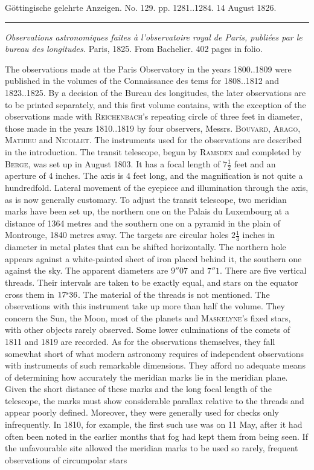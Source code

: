 \clearpage
{}
\hypertarget{native-646-lower}{}
\begin{center}\small Göttingische gelehrte Anzeigen. No. 129. pp. 1281..1284. 14 August 1826.\\[3pt]\rule{.72\linewidth}{.3pt}\end{center}

\emph{Observations astronomiques faites à l'observatoire royal de Paris, publiées par le bureau des longitudes.} Paris, 1825. From Bachelier. 402 pages in folio.

The observations made at the Paris Observatory in the years 1800..1809 were published in the volumes of the Connaissance des tems for 1808..1812 and 1823..1825. By a decision of the Bureau des longitudes, the later observations are to be printed separately, and this first volume contains, with the exception of the observations made with \textsc{Reichenbach}'s repeating circle of three feet in diameter, those made in the years 1810..1819 by four observers, Messrs. \textsc{Bouvard}, \textsc{Arago}, \textsc{Mathieu} and \textsc{Nicollet}. The instruments used for the observations are described in the introduction. The transit telescope, begun by \textsc{Ramsden} and completed by \textsc{Berge}, was set up in August 1803. It has a focal length of $7\frac{1}{2}$ feet and an aperture of 4 inches. The axis is 4 feet long, and the magnification is not quite a hundredfold. Lateral movement of the eyepiece and illumination through the axis, as is now generally customary. To adjust the transit telescope, two meridian marks have been set up, the northern one on the Palais du Luxembourg at a distance of 1364 metres and the southern one on a pyramid in the plain of Montrouge, 1840 metres away. The targets are circular holes $2\frac{1}{4}$ inches in diameter in metal plates that can be shifted horizontally. The northern hole appears against a white-painted sheet of iron placed behind it, the southern one against the sky. The apparent diameters are $9''07$ and $7''1$. There are five vertical threads. Their intervals are taken to be exactly equal, and stars on the equator cross them in $17^{\rm s}36$. The material of the threads is not mentioned. The observations with this instrument take up more than half the volume. They concern the Sun, the Moon, most of the planets and \textsc{Maskelyne}'s fixed stars, with other objects rarely observed. Some lower culminations of the comets of 1811 and 1819 are recorded. As for the observations themselves, they fall somewhat short of what modern astronomy requires of independent observations with instruments of such remarkable dimensions. They afford no adequate means of determining how accurately the meridian marks lie in the meridian plane. Given the short distance of these marks and the long focal length of the telescope, the marks must show considerable parallax relative to the threads and appear poorly defined. Moreover, they were generally used for checks only infrequently. In 1810, for example, the first such use was on 11 May, after it had often been noted in the earlier months that fog had kept them from being seen. If the unfavourable site allowed the meridian marks to be used so rarely, frequent observations of circumpolar stars 